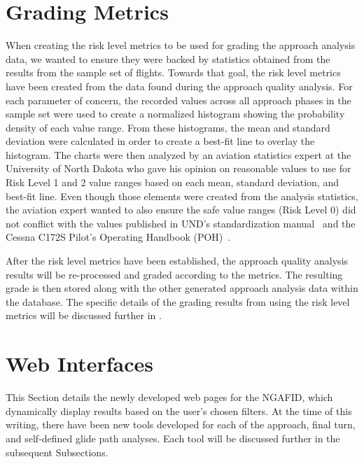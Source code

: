\section{Grading Metrics}
    
    When creating the risk level metrics to be used for grading the approach analysis data, we wanted to ensure they were backed by statistics obtained from the results from the sample set of flights.  Towards that goal, the risk level metrics have been created from the data found during the approach quality analysis.  For each parameter of concern, the recorded values across all approach phases in the sample set were used to create a normalized histogram showing the probability density of each value range.  From these histograms, the mean and standard deviation were calculated in order to create a best-fit line to overlay the histogram.  The charts were then analyzed by an aviation statistics expert at the University of North Dakota who gave his opinion on reasonable values to use for Risk Level 1 and 2 value ranges based on each mean, standard deviation, and best-fit line.  Even though those elements were created from the analysis statistics, the aviation expert wanted to also ensure the safe value ranges (Risk Level 0) did not conflict with the values published in UND's standardization manual~\cite{und_flight_manual} and the Cessna C172S Pilot's Operating Handbook (POH)~\cite{und_poh}.
    
    After the risk level metrics have been established, the approach quality analysis results will be re-processed and graded according to the metrics.  The resulting grade is then stored along with the other generated approach analysis data within the database.  The specific details of the grading results from using the risk level metrics will be discussed further in .
    
    
\section{Web Interfaces}

	This Section details the newly developed web pages for the NGAFID, which dynamically display results based on the user's chosen filters.  At the time of this writing, there have been new tools developed for each of the approach, final turn, and self-defined glide path analyses.  Each tool will be discussed further in the subsequent Subsections.
    
